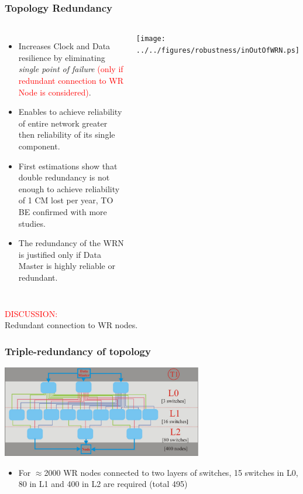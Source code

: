 \documentclass[]{beamer}
\begin{document}
\begin{frame}
  \frametitle{Topology Redundancy}   

  \begin{columns}[c]
  \column{3.8in} 

  \begin{itemize}
  \item Increases Clock and Data resilience by eliminating \textit{single point
	of failure} \textcolor{red}{(only if redundant connection to WR Node is
	considered)}.
  \item Enables to achieve reliability of entire network greater then
	reliability of its single component.
  \item First estimations show that double redundancy is not enough to achieve
	reliability of 1 CM lost per year, TO BE confirmed with more studies.
  \item The redundancy of the WRN is justified only if Data Master is
	highly reliable or redundant.
  \end{itemize}

  \column{1.2in}
  \centering
  \texttt{[image: ../../figures/robustness/inOutOfWRN.ps]}

  \end{columns}
\centering
\textcolor{red}{DISCUSSION:} \\
Redundant connection to WR nodes.

\end{frame}

\begin{frame}
  \frametitle{Triple-redundancy of topology}
  \centering
  \includegraphics[height=4cm,keepaspectratio]{../../figures/robustness/tripleTopology}

  \begin{itemize}
  \item For $\approx$2000 WR nodes connected to two layers of switches,
        15 switches in L0, 80 in L1 and 400 in L2 are required (total 495)
  \end{itemize}

\end{frame}
\end{document}
